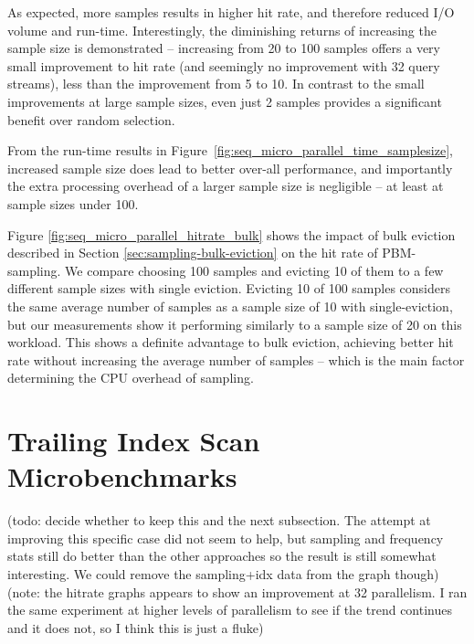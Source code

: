 As expected, more samples results in higher hit rate, and therefore reduced I/O volume and run-time. Interestingly, the diminishing returns of increasing the sample size is demonstrated -- increasing from 20 to 100 samples offers a very small improvement to hit rate (and seemingly no improvement with 32 query streams), less than the improvement from 5 to 10. In contrast to the small improvements at large sample sizes, even just 2 samples provides a significant benefit over random selection.

From the run-time results in Figure~\ref{fig:seq_micro_parallel_time_samplesize}, increased sample size does lead to better over-all performance, and importantly the extra processing overhead of a larger sample size is negligible -- at least at sample sizes under 100.

Figure \ref{fig:seq_micro_parallel_hitrate_bulk} shows the impact of bulk eviction described in Section \ref{sec:sampling-bulk-eviction} on the hit rate of PBM-sampling. We compare choosing 100 samples and evicting 10 of them to a few different sample sizes with single eviction. Evicting 10 of 100 samples considers the same average number of samples as a sample size of 10 with single-eviction, but our measurements show it performing similarly to a sample size of 20 on this workload. This shows a definite advantage to bulk eviction, achieving better hit rate without increasing the average number of samples -- which is the main factor determining the CPU overhead of sampling.



\section{Trailing Index Scan Microbenchmarks}

(todo: decide whether to keep this and the next subsection. The attempt at improving this specific case did not seem to help, but sampling and frequency stats still do better than the other approaches so the result is still somewhat interesting. We could remove the sampling+idx data from the graph though)
(note: the hitrate graphs appears to show an improvement at 32 parallelism. I ran the same experiment at higher levels of parallelism to see if the trend continues and it does not, so I think this is just a fluke)

